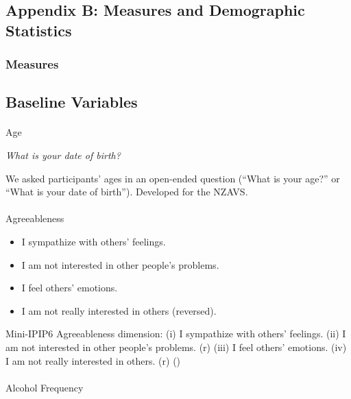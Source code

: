 \documentclass[
  single column]{article}
\makeatletter
\let\oldparagraph\paragraph
\renewcommand{\paragraph}{
    \@ifstar
      \xxxParagraphStar
      \xxxParagraphNoStar
  }
\newcommand{\xxxParagraphStar}[1]{\oldparagraph*{#1}\mbox{}}
\newcommand{\xxxParagraphNoStar}[1]{\oldparagraph{#1}\mbox{}}
\providecommand{\tightlist}{%
  \setlength{\itemsep}{0pt}\setlength{\parskip}{0pt}}\usepackage{longtable,booktabs,array}
\makeatother
\begin{document}
\newpage{}

\subsection{Appendix B: Measures and Demographic
Statistics}\label{appendix-baseline}

\subsubsection{Measures}\label{measures}

\subsection{Baseline Variables}\label{baseline-variables}

\paragraph{Age}\label{age}

\emph{What is your date of birth?}

We asked participants' ages in an open-ended question (``What is your
age?'' or ``What is your date of birth''). Developed for the NZAVS.

\paragraph{Agreeableness}\label{agreeableness}

\begin{itemize}
\tightlist
\item
  I sympathize with others' feelings.
\item
  I am not interested in other people's problems.
\item
  I feel others' emotions.
\item
  I am not really interested in others (reversed).
\end{itemize}

Mini-IPIP6 Agreeableness dimension: (i) I sympathize with others'
feelings. (ii) I am not interested in other people's problems. (r) (iii)
I feel others' emotions. (iv) I am not really interested in others. (r)
()

\paragraph{Alcohol Frequency}\label{alcohol-frequency}
\end{document}
